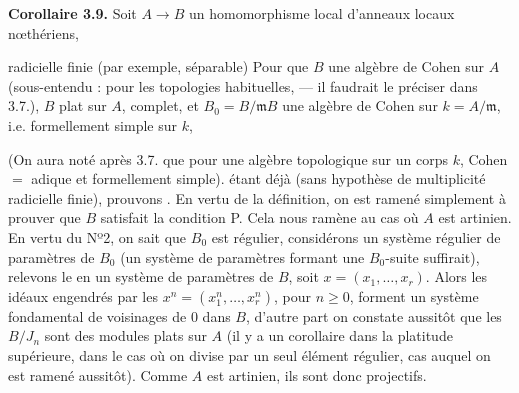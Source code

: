 \documentclass[11pt,a4paper]{article}
\begin{document}

\textbf{Corollaire 3.9.} Soit $A \to B$ un homomorphisme local d'anneaux
locaux nœthériens, 


radicielle finie (par exemple,  séparable)   Pour que $B$   une algèbre de
Cohen sur $A$ (sous-entendu : pour les topologies habituelles, --- il faudrait
le préciser dans 3.7.),  $B$ 
 plat sur $A$, complet, et  $B_0 = B/\mathfrak{m}B$
  une algèbre de Cohen sur $k = A/\mathfrak{m}$, i.e.
formellement simple sur $k$,  

(On aura noté  après 3.7. que pour une algèbre topologique sur
un corps $k$, Cohen $=$ adique et formellement simple).
  étant déjà  (sans hypothèse de
multiplicité radicielle finie), prouvons 
 . En vertu de la
définition, on est ramené simplement à prouver que $B$ satisfait la condition
P. Cela nous ramène au cas où $A$ est artinien. En vertu du Nº2, on sait que
$B_0$ est régulier, considérons un système régulier de paramètres de $B_0$
(un système de paramètres formant une $B_0$-suite suffirait), relevons le en
un système de paramètres de $B$, soit $x = (x_1, \ldots, x_r)$. Alors les
idéaux engendrés par les $x^n = (x_1^n, \ldots, x_r^n)$, pour $n \geqslant 0$,
forment un système fondamental de voisinages  de $0$ dans $B$,
d'autre part on constate aussitôt que les $B/J_n$ sont des modules plats sur
$A$ (il y a un  corollaire dans la platitude supérieure, dans le
cas où on divise par un seul élément  régulier, cas auquel on
est ramené aussitôt). Comme $A$ est artinien, ils sont donc projectifs.
\end{document}

